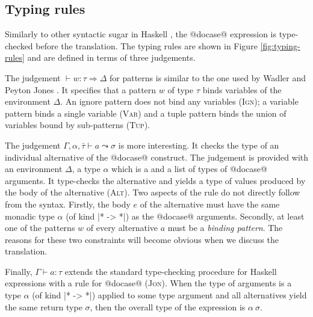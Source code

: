 \documentclass[preprint]{sigplanconf}
\begin{document}

\subsection{Typing rules}
\label{sec:extension-typing}

Similarly to other syntactic sugar in Haskell \cite{groupordercompre}, the @docase@ expression 
is type-checked before the translation. The typing rules are shown in Figure \ref{fig:typing-rules} 
and are defined in terms of three judgements.

The judgement $\vdash w : \tau \Rightarrow \Delta$ for patterns is similar to the one used by
Wadler and Peyton Jones \cite{groupordercompre}. It specifies that a pattern $w$ of type $\tau$ binds 
variables of the environment $\Delta$. An ignore pattern does not bind any variables (\textsc{Ign}); 
a variable pattern binds a single variable (\textsc{Var}) and a tuple pattern binds the union of 
variables bound by sub-patterns (\textsc{Tup}).

The judgement $\Gamma, \alpha, \bar{\tau} \vdash a \leadsto \sigma $ is more interesting. It 
checks the type of an individual alternative of the @docase@ construct. The judgement is provided 
with an environment $\Delta$, a type $\alpha$ which is a  and a list of types of 
@docase@ arguments. It type-checks the alternative and yields a type of values produced by the
body of the alternative (\textsc{Alt}). Two aspects of the rule do not directly follow 
from the syntax. Firstly, the body $e$ of the alternative must have the same monadic type 
$\alpha$ (of kind |* -> *|) as the @docase@ arguments. Secondly, at least one of the patterns $w$
of every alternative $a$ must be a \textit{binding pattern}. The reasons for these two constraints 
will become obvious when we discuss the translation.

Finally, $\Gamma \vdash a : \tau$ extends the standard type-checking procedure
for Haskell expressions with a rule for @docase@ (\textsc{Jon}). When the type of arguments is 
a  type $\alpha$ (of kind |* -> *|) applied to some type argument and all 
alternatives yield the same return type $\sigma$, then the overall type of the expression is 
$\alpha \ \sigma$.
\end{document}
